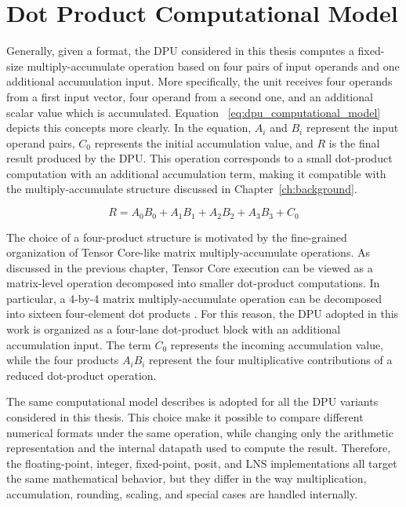 \section{Dot Product Computational Model}

Generally, given a format, the DPU considered in this thesis computes a fixed-size multiply-accumulate operation based on four pairs of input operands and one additional accumulation input. More specifically, the unit receives four operands from a first input vector, four operand from a second one, and an additional scalar value which is accumulated. Equation ~\eqref{eq:dpu_computational_model} depicts this concepts more clearly. In the equation, $A_i$ and $B_i$ represent the input operand pairs, $C_0$ represents the initial accumulation value, and $R$ is the final result produced by the DPU. This operation corresponds to a small dot-product computation with an additional accumulation term, making it compatible with the multiply-accumulate structure discussed in Chapter~\ref{ch:background}.

\begin{equation}
R = A_0B_0 + A_1B_1 + A_2B_2 + A_3B_3 + C_0
\label{eq:dpu_computational_model}
\end{equation}

The choice of a four-product structure is motivated by the fine-grained organization of Tensor Core-like matrix multiply-accumulate operations. As discussed in the previous chapter, Tensor Core execution can be viewed as a matrix-level operation decomposed into smaller dot-product computations. In particular, a 4-by-4 matrix multiply-accumulate operation can be decomposed into sixteen four-element dot products \cite{raihan2019modeling}. For this reason, the DPU adopted in this work is organized as a four-lane dot-product block with an additional accumulation input. The term $C_0$ represents the incoming accumulation value, while the four products $A_iB_i$ represent the four multiplicative contributions of a reduced dot-product operation.

The same computational model describes is adopted for all the DPU variants considered in this thesis. This choice make it possible to compare different numerical formats under the same operation, while changing only the arithmetic representation and the internal datapath used to compute the result. Therefore, the floating-point, integer, fixed-point, posit, and LNS implementations all target the same mathematical behavior, but they differ in the way multiplication, accumulation, rounding, scaling, and special cases are handled internally.

